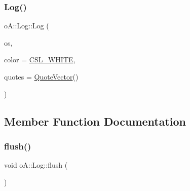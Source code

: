 \mbox{\label{classo_a_1_1_log_a69d8bda8bb1a902606866c757df8c018}} 
\subsubsection{\texorpdfstring{Log()}{Log()}\hspace{0.1cm}{\footnotesize\ttfamily [2/2]}}
{\footnotesize\ttfamily o\+A\+::\+Log\+::\+Log (\begin{DoxyParamCaption}\item[{\mbox{\hyperlink{namespaceo_a_ab69b2110953f22401259db9c6ddc7905}{O\+Stream}} \&}]{os,  }\item[{const \mbox{\hyperlink{namespaceo_a_a747e07c1977a29f3e1d38683043ec927}{Console\+Color}} \&}]{color = {\ttfamily \mbox{\hyperlink{namespaceo_a_a4afb55957ed6dcda70e81d6dd8f07885}{C\+S\+L\+\_\+\+W\+H\+I\+TE}}},  }\item[{const \mbox{\hyperlink{namespaceo_a_a38695044d9ec0b57190f4e3fab0caffd}{Quote\+Vector}} \&}]{quotes = {\ttfamily \mbox{\hyperlink{namespaceo_a_a38695044d9ec0b57190f4e3fab0caffd}{Quote\+Vector}}()} }\end{DoxyParamCaption})}



\subsection{Member Function Documentation}
\mbox{\label{classo_a_1_1_log_ae0c062e6cd347b0e74f74c958a05b20d}} 
\subsubsection{\texorpdfstring{flush()}{flush()}}
{\footnotesize\ttfamily void o\+A\+::\+Log\+::flush (\begin{DoxyParamCaption}\item[{void}]{ }\end{DoxyParamCaption})\hspace{0.3cm}{\ttfamily [noexcept]}}

\mbox{\label{classo_a_1_1_log_a8b2af8c62c63699ba4caebafb37e9268}} 
